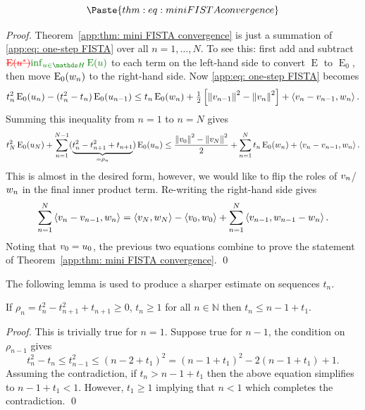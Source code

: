 \documentclass[smallextended]{svjour3}
\let\F\mathds\let\C\mathcal\newcommand{\R}{\F{R}}\newcommand{\A}{\tens{A}}
\newcommand{\norm}[1]{{\left\lVert #1 \right\rVert}}
\newcommand{\IP}[2]{\left\langle #1,#2 \right\rangle}
\newcommand{\op}[1]{\operatorname{#1}}
\newcommand{\1}{\F{1}}
\newcommand{\Emin}[1][\varf0]{\inf_{#1\in\F H}\op{E}(#1)}
\newcommand*{\varf}[1]{%
	\IfEqCase{#1}{%
		{0}{u}%
		{1}{v}%
		{2}{w}%
	}[u#1]%
}
\newcommand{\edit}[2]{{\ifmmode\text{\color{red}\sout{\ensuremath{#1}}}\else {\color{red} \sout{#1}}\fi} {\color{darkgreen} #2}}
\begin{document}
	\begin{theorem}\label{app:thm: mini FISTA convergence}
		\begin{equation}\label{app:eq: FISTA inequality}
			\Paste{thm:eq: mini FISTA convergence}
		\end{equation}
	\end{theorem}
	\begin{proof}
		Theorem~\ref{app:thm: mini FISTA convergence} is just a summation of \eqref{app:eq: one-step FISTA} over all $n=1,\ldots,N$. To see this: first add and subtract $\edit{\op{E}(\varf0^*)}{\Emin}$ to each term on the left-hand side to convert $\op{E}$ to $\op{E}_0$, then move $\op{E}_0(\varf2_n)$ to the right-hand side. Now \eqref{app:eq: one-step FISTA} becomes
		\begin{equation}
			t_n^2\op{E}_0(\varf0_n) - (t_n^2-t_n)\op{E}_0(\varf0_{n-1}) \leq t_n\op{E}_0(\varf2_n) + \tfrac1{2}\left[\norm{\varf1_{n-1}}^2-\norm{\varf1_n}^2\right] + \IP{\varf1_n-\varf1_{n-1}}{\varf2_n}. 
		\end{equation}
		Summing this inequality from $n=1$ to $n=N$ gives
		\begin{equation}
			t_N^2\op{E}_0(\varf0_N) + \sum_{n=1}^{N-1}(\underbrace{t_n^2-t_{n+1}^2+t_{n+1}}_{=\rho_n})\op{E}_0(\varf0_n) \leq \frac{\norm{\varf1_0}^2-\norm{\varf1_N}^2}{2} + \sum_{n=1}^N t_n\op{E}_0(\varf2_n)+\IP{\varf1_n-\varf1_{n-1}}{\varf2_n}.
		\end{equation}
		This is almost in the desired form, however, we would like to flip the roles of $\varf1_n$/$\varf2_n$ in the final inner product term. Re-writing the right-hand side gives
		\begin{equation}
			\sum_{n=1}^N\IP{\varf1_n-\varf1_{n-1}}{\varf2_n} = \IP{\varf1_N}{\varf2_N} - \IP{\varf1_0}{\varf2_0}+ \sum_{n=1}^N\IP{\varf1_{n-1}}{\varf2_{n-1}-\varf2_n}.
		\end{equation}
		Noting that $\varf1_0=\varf0_0$, the previous two equations combine to prove the statement of Theorem~\ref{app:thm: mini FISTA convergence}.
		\qed\end{proof}
	
	The following lemma is used to produce a sharper estimate on sequences $t_n$.
	\begin{lemma}\label{app: tn upper bound}
		If $\rho_n=t_{n}^2-t_{n+1}^2+t_{n+1}\geq0$, $t_n\geq 1$ for all $n\in\F N$ then $t_n\leq n-1 +t_1$.
	\end{lemma}
	\begin{proof}
		This is trivially true for $n=1$. Suppose true for $n-1$, the condition on $\rho_{n-1}$ gives
		\begin{equation}
			t_n^2 -t_n \leq t_{n-1}^2 \leq (n-2+t_1)^2 = (n-1+t_1)^2 -2(n-1+t_1) + 1.
		\end{equation}
		Assuming the contradiction, if $t_n> n-1+t_1$ then the above equation simplifies to $n-1+t_1 < 1$. However, $t_1\geq 1$ implying that $n<1$ which completes the contradiction.
		\qed\end{proof}
	
\end{document}
